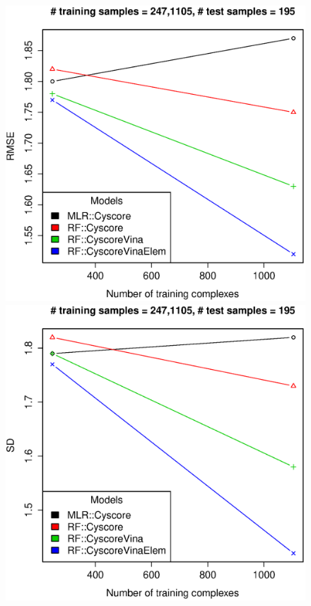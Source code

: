 \documentclass[journal=jacsat,manuscript=article]{achemso}
\begin{document}
\begin{figure}[ht!]
\includegraphics[width=\linewidth]{../rfcyscore/tst-195-rmse.eps}
\endminipage
{}
\includegraphics[width=\linewidth]{../rfcyscore/tst-195-sdev.eps}

\end{figure}
\end{document}
